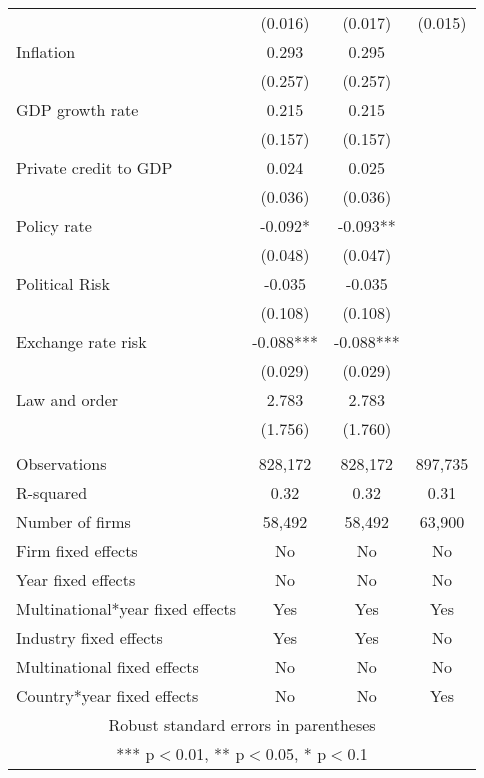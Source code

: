 \begin{tabular}{lccc}
 & (0.016) & (0.017) & (0.015) \\
Inflation & 0.293 & 0.295 &  \\
 & (0.257) & (0.257) &  \\
GDP growth rate & 0.215 & 0.215 &  \\
 & (0.157) & (0.157) &  \\
Private credit to GDP & 0.024 & 0.025 &  \\
 & (0.036) & (0.036) &  \\
Policy rate & -0.092* & -0.093** &  \\
 & (0.048) & (0.047) &  \\
Political Risk & -0.035 & -0.035 &  \\
 & (0.108) & (0.108) &  \\
Exchange rate risk & -0.088*** & -0.088*** &  \\
 & (0.029) & (0.029) &  \\
Law and order & 2.783 & 2.783 &  \\
 & (1.756) & (1.760) &  \\
 &  &  &  \\
Observations & 828,172 & 828,172 & 897,735 \\
R-squared & 0.32 & 0.32 & 0.31 \\
Number of firms & 58,492 & 58,492 & 63,900 \\
Firm fixed effects & No & No & No \\
Year fixed effects & No & No & No \\
Multinational*year fixed effects & Yes & Yes & Yes \\
Industry fixed effects & Yes & Yes & No \\
Multinational fixed effects & No & No & No \\
 Country*year fixed effects & No & No & Yes \\ \hline
\multicolumn{4}{c}{ Robust standard errors in parentheses} \\
\multicolumn{4}{c}{ *** p$<$0.01, ** p$<$0.05, * p$<$0.1} \\
\end{tabular}
